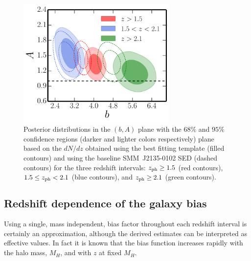 \begin{figure} %
\centering %
\includegraphics[width=0.7\textwidth]{Chapter4/Images/b_A_SMM_Pearson}
\caption{Posterior distributions in the $(b,A)$ plane with the $68\%$ and $95\%$ confidence regions (darker and lighter colors respectively) plane based on the $dN/dz$ obtained using the \citet{Pearson2013} best fitting template (filled contours) and using the baseline SMM~J2135-0102 SED (dashed contours) for the three redshift intervals: $z_{\rm{ph}} \ge 1.5$ (red contours), $1.5 \le z_{\rm{ph}} < 2.1$ (blue contours), and $z_{\rm{ph}} \ge 2.1$ (green contours).\label{fig:b_A_SMM_Pearson}}
\end{figure}

\subsection{Redshift dependence of the galaxy bias}
\label{sec:bz}
Using a single, mass independent, bias factor throughout each redshift interval is certainly an approximation, although the derived estimates can be interpreted as effective values. In fact it is known \citep[e.g., ][]{Sheth2001,Mo2010} that the bias function increases rapidly with the halo mass, $M_H$, and with $z$ at fixed $M_H$.

